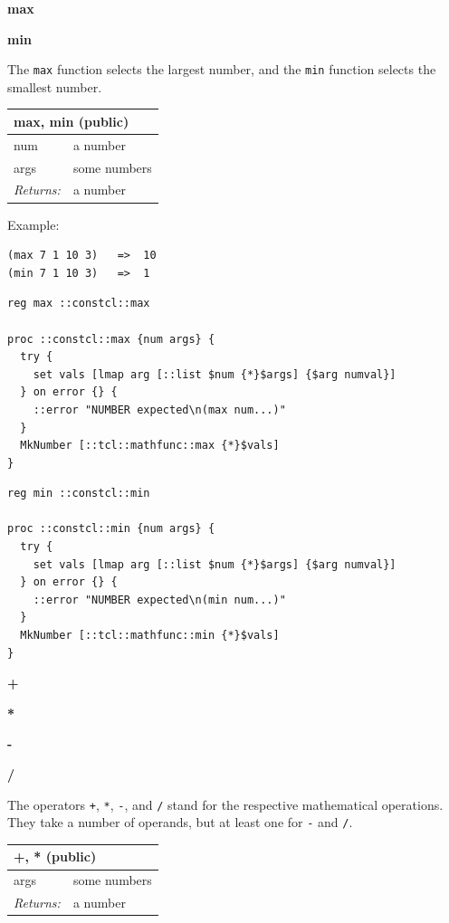 \documentclass[twoside,9pt]{report}
\begin{document}
\textbf{max}


\textbf{min}


The \texttt{max} function selects the largest number, and the \texttt{min} function selects the smallest number.

\begin{tabular}{ |l l| }
\hline
\multicolumn{2}{|l|}{max, min (public)} \\
\hline
num & a number \\
args & some numbers \\
\textit{Returns:} & a number \\
\hline
\end{tabular}


Example:

\noindent\makebox[\linewidth]{\rule{\linewidth}{0.4pt}}
\begin{lstlisting}
(max 7 1 10 3)   =>  10
(min 7 1 10 3)   =>  1
\end{lstlisting}
\noindent\makebox[\linewidth]{\rule{\linewidth}{0.4pt}}
\noindent\makebox[\linewidth]{\rule{\linewidth}{0.4pt}}
\begin{lstlisting}
reg max ::constcl::max
 
proc ::constcl::max {num args} {
  try {
    set vals [lmap arg [::list $num {*}$args] {$arg numval}]
  } on error {} {
    ::error "NUMBER expected\n(max num...)"
  }
  MkNumber [::tcl::mathfunc::max {*}$vals]
}
\end{lstlisting}
\noindent\makebox[\linewidth]{\rule{\linewidth}{0.4pt}}
\noindent\makebox[\linewidth]{\rule{\linewidth}{0.4pt}}
\begin{lstlisting}
reg min ::constcl::min
 
proc ::constcl::min {num args} {
  try {
    set vals [lmap arg [::list $num {*}$args] {$arg numval}]
  } on error {} {
    ::error "NUMBER expected\n(min num...)"
  }
  MkNumber [::tcl::mathfunc::min {*}$vals]
}
\end{lstlisting}
\noindent\makebox[\linewidth]{\rule{\linewidth}{0.4pt}}

\textbf{+}


\textbf{*}


\textbf{-}


\textbf{/}


The operators \texttt{+}, \texttt{*}, \texttt{-}, and \texttt{/} stand for the respective mathematical operations. They take a number of operands, but at least one for \texttt{-} and \texttt{/}.

\begin{tabular}{ |l l| }
\hline
\multicolumn{2}{|l|}{+, * (public)} \\
\hline
args & some numbers \\
\textit{Returns:} & a number \\
\hline
\end{tabular}
\end{document}
